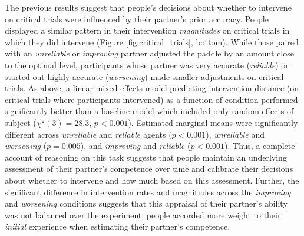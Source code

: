 \documentclass[10pt,letterpaper]{article}
\begin{document}
The previous results suggest that people's decisions about whether to intervene on critical trials were influenced by their partner's prior accuracy. People displayed a similar pattern in their intervention \textit{magnitudes} on critical trials in which they did intervene (Figure \ref{fig:critical_trials}, bottom). While those paired with an \textit{unreliable} or \textit{improving} partner adjusted the paddle by an amount close to the optimal level, participants whose partner was very accurate (\textit{reliable}) or started out highly accurate (\textit{worsening}) made smaller adjustments on critical trials. As above, a linear mixed effects model predicting intervention distance (on critical trials where participants intervened) as a function of condition performed significantly better than a baseline model which included only random effects of subject ($\chi^2(3) = 28.3$, $p < 0.001$). Estimated marginal means were significantly different across \textit{unreliable} and \textit{reliable} agents ($p < 0.001$), \textit{unreliable} and \textit{worsening} ($p = 0.005$), and \textit{improving} and \textit{reliable} ($p < 0.001$). Thus, a complete account of reasoning on this task suggests that people maintain an underlying assessment of their partner's competence over time and calibrate their decisions about whether to intervene and how much based on this assessment. Further, the significant difference in intervention rates and magnitudes across the \textit{improving} and \textit{worsening} conditions suggests that this appraisal of their partner's ability was not balanced over the experiment; people accorded more weight to their \textit{initial} experience when estimating their partner's competence.
\end{document}
